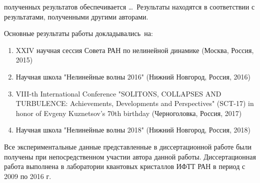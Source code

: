 {\reliability} полученных результатов обеспечивается \ldots \ Результаты находятся в соответствии с результатами, полученными другими авторами.


{\probation}
Основные результаты работы докладывались~на:
\begin{enumerate}
	\item XXIV научная сессия Совета РАН по нелинейной динамике (Москва, Россия, 2015)
	\item Научная школа "Нелинейные волны 2016" (Нижний Новгород, Россия, 2016)
	\item VIII-th International Conference "SOLITONS, COLLAPSES AND TURBULENCE: Achievements, Developments and Perspectives" (SCT-17) in honor of Evgeny Kuznetsov's 70th birthday (Черноголовка, Россия, 2017)
	\item Научная школа "Нелинейные волны 2018" (Нижний Новгород, Россия, 2018)

\end{enumerate}


{\contribution} Все экспериментальные данные представленные в диссертационной работе были получены при непосредственном участии автора данной работы. Диссертационная работа выполнена в лаборатории квантовых кристаллов ИФТТ РАН в период с 2009 по 2016 г.


